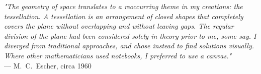 \begin{flushright}
\emph{"The geometry of space translates to a reoccurring theme in my creations: the tessellation. A tessellation is an arrangement of closed shapes that completely covers the plane without overlapping and without leaving gaps. The regular division of the plane had been considered solely in theory prior to me, some say. I diverged from traditional approaches, and chose instead to find solutions visually. Where other mathematicians used notebooks, I preferred to use a canvas."}\\
 — M.~C.~Escher, circa 1960
\end{flushright}
